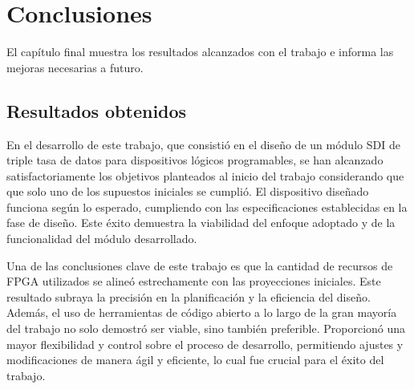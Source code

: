 \chapter{Conclusiones}\label{Chapter5}

El capítulo final muestra los resultados alcanzados con el trabajo e informa las
mejoras necesarias a futuro.

\section{Resultados obtenidos}




En el desarrollo de este trabajo, que consistió en el diseño de un módulo SDI
de triple tasa de datos para dispositivos lógicos programables, se han
alcanzado satisfactoriamente los objetivos planteados al inicio del trabajo
considerando que que solo uno de los supuestos iniciales se cumplió. El
dispositivo diseñado funciona según lo esperado, cumpliendo con las
especificaciones establecidas en la fase de diseño. Este éxito demuestra la
viabilidad del enfoque adoptado y de la funcionalidad del módulo desarrollado.

Una de las conclusiones clave de este trabajo es que la cantidad de recursos
de FPGA utilizados se alineó estrechamente con las proyecciones iniciales.
Este resultado subraya la precisión en la planificación y la eficiencia del
diseño. Además, el uso de herramientas de código abierto a lo largo de la gran
mayoría del trabajo no solo demostró ser viable, sino también preferible.
Proporcionó una mayor flexibilidad y control sobre el proceso de desarrollo,
permitiendo ajustes y modificaciones de manera ágil y eficiente, lo cual fue
crucial para el éxito del trabajo.

